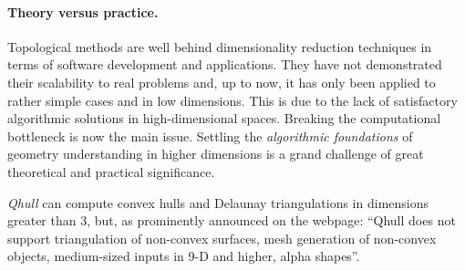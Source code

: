 
\paragraph{Theory versus practice.} 
Topological methods are well behind dimensionality reduction techniques in terms of 
software development and applications. They have not demonstrated their scalability to real problems and, up to now, it has only been applied to rather simple cases and in low dimensions.  
This is  due to the lack of satisfactory algorithmic solutions in high-dimensional spaces.
Breaking the computational bottleneck is now the main issue.  Settling the {\em algorithmic foundations} of geometry understanding in
higher dimensions is a grand challenge of great theoretical and practical significance.


{\em Qhull} can compute convex hulls and Delaunay triangulations in dimensions greater than 3, but, as prominently announced on the webpage: ``Qhull does not support triangulation of non-convex surfaces, mesh generation of non-convex objects, medium-sized inputs in 9-D and higher, alpha shapes''. 

